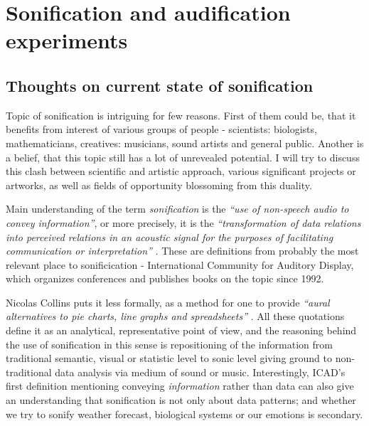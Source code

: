 \documentclass[12pt,a4paper,oneside]{report}
\begin{document}
\chapter{Sonification and audification experiments}

\section{Thoughts on current state of sonification}


Topic of sonification is intriguing for few reasons. First of them could be, that it benefits from interest of various groups of people - scientists: biologists, mathematicians, creatives: musicians, sound artists and general public. Another is a belief, that this topic still has a lot of unrevealed potential. I will try to discuss this clash between scientific and artistic approach, various significant projects or artworks, as well as fields of opportunity blossoming from this duality.

Main understanding of the term \emph{sonification} is the \emph{``use of non-speech audio to convey information''}, or more precisely, it is the \emph{``transformation of data relations into perceived relations in an acoustic signal for the purposes of facilitating communication or interpretation''} \cite{Fitch}. These are definitions from probably the most relevant place to sonificication - International Community for Auditory Display, which organizes conferences and publishes books on the topic since 1992.

Nicolas Collins puts it less formally, as a method for one to provide \emph{``aural alternatives to pie charts, line graphs and spreadsheets''} \cite{Collins2006}. All these quotations define it as an analytical, representative point of view, and the reasoning behind the use of sonification in this sense is repositioning of the information from traditional semantic, visual or statistic level to sonic level giving ground to non-traditional data analysis via medium of sound or music. Interestingly, ICAD's first definition mentioning conveying \emph{information} rather than data can also give an understanding that sonification is not only about data patterns; and whether we try to sonify weather forecast, biological systems or our emotions is secondary.
\end{document}
